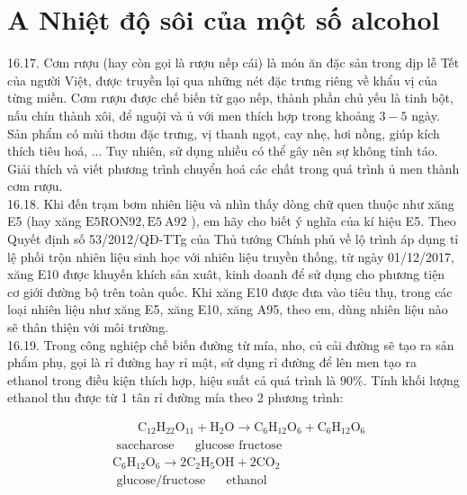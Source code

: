 \documentclass[10pt]{article}
\begin{document}
\section*{A Nhiệt độ sôi của một số alcohol}
16.17. Cơm rượu (hay còn gọi là rượu nếp cái) là món ăn đặc sản trong dịp lễ Tết của người Việt, được truyền lại qua những nét đặc trưng riêng về khẩu vị của từng miền. Cơm rượu được chế biến từ gạo nếp, thành phần chủ yếu là tinh bột, nấu chín thành xôi, để nguội và ủ với men thích hợp trong khoảng $3-5$ ngày. Sản phẩm có mùi thơm đặc trưng, vị thanh ngọt, cay nhẹ, hơi nồng, giúp kích thích tiêu hoá, ... Tuy nhiên, sử dụng nhiều có thể gây nên sự không tỉnh táo. Giải thích và viết phương trình chuyển hoá các chất trong quá trình ủ men thành cơm rượu.\\
16.18. Khi đến trạm bơm nhiên liệu và nhìn thấy dòng chữ quen thuộc như xăng E5 (hay xăng $\mathrm{E} 5 \mathrm{RON} 92, \mathrm{E} 5 \mathrm{~A} 92$ ), em hãy cho biết ý nghĩa của kí hiệu E5. Theo Quyết định số 53/2012/QĐ-TTg của Thủ tướng Chính phủ về lộ trình áp dụng tỉ lệ phối trộn nhiên liệu sinh học với nhiên liệu truyền thống, từ ngày 01/12/2017, xăng E10 được khuyến khích sản xuât, kinh doanh để sử dụng cho phương tiện cơ giới đường bộ trên toàn quốc. Khi xăng E10 được đưa vào tiêu thụ, trong các loại nhiên liệu như xăng E5, xăng E10, xăng A95, theo em, dùng nhiên liệu nào sẽ thân thiện với môi trường.\\
16.19. Trong công nghiệp chế biến đường từ mía, nho, củ cải đường sẽ tạo ra sản phẩm phụ, gọi là rỉ đường hay rỉ mật, sử dụng rỉ đường để lên men tạo ra ethanol trong điều kiện thích hợp, hiệu suất cả quá trình là $90 \%$. Tính khối lượng ethanol thu được từ 1 tân rỉ đường mía theo 2 phương trình:

$$
\begin{aligned}
& \qquad \mathrm{C}_{12} \mathrm{H}_{22} \mathrm{O}_{11}+\mathrm{H}_{2} \mathrm{O} \rightarrow \mathrm{C}_{6} \mathrm{H}_{12} \mathrm{O}_{6}+\mathrm{C}_{6} \mathrm{H}_{12} \mathrm{O}_{6} \\
& \text { saccharose } \quad \text { glucose fructose } \\
& \mathrm{C}_{6} \mathrm{H}_{12} \mathrm{O}_{6} \rightarrow 2 \mathrm{C}_{2} \mathrm{H}_{5} \mathrm{OH}+2 \mathrm{CO}_{2} \\
& \text { glucose/fructose } \quad \text { ethanol }
\end{aligned}
$$
\end{document}
